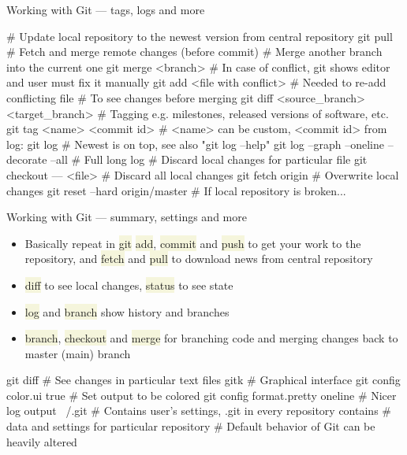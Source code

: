 \documentclass[compress, xelatex, 11pt, xcolor=svgnames, aspectratio=169,
	hyperref={
		bookmarks=true,
		unicode=true,
		colorlinks=true,
		pdftitle={Linux, command line and MetaCentrum},
		plainpages=false,
		pdfauthor={Vojtech Zeisek},
		pdfsubject={Course about use of Linux command line, writing shell scripts and using MetaCentrum of CESNET},
		pdfcreator={XeLaTeX},
		pdfkeywords={Linux, GNU, BASH, shell, command line, MetaCentrum},
		linkcolor=DarkRed, %
		anchorcolor=DarkBlue, %
		citecolor=Indigo, %
		filecolor=NavyBlue, %
		menucolor=DarkMagenta, %
		urlcolor=DarkBlue, %
		},
	url={hyphens, lowtilde} %
	]{beamer}
\renewcommand{\texttt}[1]{\colorbox{Beige}{{\ttfamily #1}}}
\begin{document}
\begin{frame}[fragile]{Working with Git --- tags, logs and more}
	\begin{bashcode}
    # Update local repository to the newest version from central repository
    git pull # Fetch and merge remote changes (before commit)
    # Merge another branch into the current one
    git merge <branch>
    # In case of conflict, git shows editor and user must fix it manually
    git add <file with conflict> # Needed to re-add conflicting file
    # To see changes before merging
    git diff <source_branch> <target_branch>
    # Tagging e.g. milestones, released versions of software, etc.
    git tag <name> <commit id> # <name> can be custom, <commit id> from log:
    git log # Newest is on top, see also "git log --help"
    git log --graph --oneline --decorate --all # Full long log
    # Discard local changes for particular file
    git checkout --- <file>
    # Discard all local changes
    git fetch origin # Overwrite local changes
    git reset --hard origin/master # If local repository is broken...
	\end{bashcode}
\end{frame}

\begin{frame}[fragile]{Working with Git --- summary, settings and more}
	\begin{itemize}
		\item Basically repeat in \texttt{git} \texttt{add}, \texttt{commit} and \texttt{push} to get your work to the repository, and \texttt{fetch} and \texttt{pull} to download news from central repository
		\item \texttt{diff} to see local changes, \texttt{status} to see state
		\item \texttt{log} and \texttt{branch} show history and branches
		\item \texttt{branch}, \texttt{checkout} and \texttt{merge} for branching code and merging changes back to master (main) branch
	\end{itemize}
	\begin{bashcode}
    git diff # See changes in particular text files
    gitk # Graphical interface
    git config color.ui true # Set output to be colored
    git config format.pretty oneline # Nicer log output
    ~/.git # Contains user's settings, .git in every repository contains
           # data and settings for particular repository
           # Default behavior of Git can be heavily altered
	\end{bashcode}
\end{frame}
\end{document}

